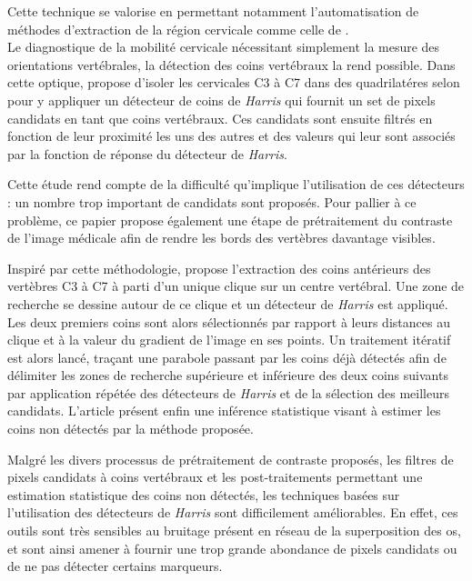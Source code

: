         Cette technique se valorise en permettant notamment l'automatisation de méthodes d'extraction de la région cervicale comme celle de \cite{Benjelloun2006a}.
        \\

        Le diagnostique de la mobilité cervicale nécessitant simplement la mesure des orientations vertébrales, la détection des coins vertébraux la rend possible. Dans cette optique, \cite{Mahmoudi2007} propose d'isoler les cervicales C3 à C7 dans des quadrilatéres selon \cite{Benjelloun2006a} pour y appliquer un détecteur de coins de {\itshape Harris} qui fournit un set de pixels candidats en tant que coins vertébraux. Ces candidats sont ensuite filtrés en fonction de leur proximité les uns des autres et des valeurs qui leur sont associés par la fonction de réponse du détecteur de {\itshape Harris}.

        Cette étude rend compte de la difficulté qu'implique l'utilisation de ces détecteurs : un nombre trop important de candidats sont proposés. Pour pallier à ce problème, ce papier propose également une étape de prétraitement du contraste de l'image médicale afin de rendre les bords des vertèbres davantage visibles.

        Inspiré par cette méthodologie, \cite{Benjelloun2009} propose l'extraction des coins antérieurs des vertèbres C3 à C7 à parti d'un unique clique sur un centre vertébral. Une zone de recherche se dessine autour de ce clique et un détecteur de {\itshape Harris} est appliqué. Les deux premiers coins sont alors sélectionnés par rapport à leurs distances au clique et à la valeur du gradient de l'image en ses points. Un traitement itératif est alors lancé, traçant une parabole passant par les coins déjà détectés afin de délimiter les zones de recherche supérieure et inférieure des deux coins suivants par application répétée des détecteurs de {\itshape Harris} et de la sélection des meilleurs candidats. L'article présent enfin une inférence statistique visant à estimer les coins non détectés par la méthode proposée.

        Malgré les divers processus de prétraitement de contraste proposés, les filtres de pixels candidats à coins vertébraux et les post-traitements permettant une estimation statistique des coins non détectés, les techniques basées sur l'utilisation des détecteurs de {\itshape Harris} sont difficilement améliorables. En effet, ces outils sont très sensibles au bruitage présent en réseau de la superposition des os, et sont ainsi amener à fournir une trop grande abondance de pixels candidats ou de ne pas détecter certains marqueurs.
        \\

